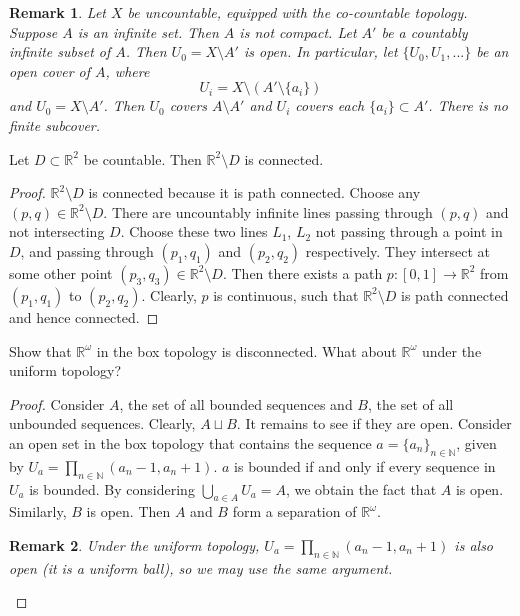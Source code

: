 \documentclass[12pt]{article}
\newtheorem{remark}{Remark}
\begin{document}
\begin{remark}
    Let $X$ be uncountable, equipped with the co-countable topology.
    Suppose $A$ is an infinite set. Then $A$ is not compact.
    Let $A'$ be a countably infinite subset of $A$. Then $U_0 = X \setminus A'$
    is open. In particular, let $\{U_0, U_1, ...\}$
    be an open cover of $A$, where $$U_i = X \setminus (A' \setminus \{a_i\})$$
    and $U_0 = X \setminus A'$.
    Then $U_0$ covers $A \setminus A'$ and $U_i$ covers each $\{a_i\} \subset A'$.
    There is no finite subcover.
\end{remark}

Let $D \subset \mathbb{R}^2$ be countable.
Then $\mathbb{R}^2 \setminus D$ is connected.
\begin{proof}
     $\mathbb{R}^2 \setminus D$ is connected because it is path connected.
     Choose any $(p, q) \in \mathbb{R}^2 \setminus D$.
     There are uncountably infinite lines passing through $(p, q)$ and not intersecting $D$.
     Choose these two lines $L_1$, $L_2$ not passing through a point in $D$,
     and passing through $(p_1, q_1)$
     and $(p_2, q_2)$ respectively.
     They intersect at some other point $(p_3, q_3) \in \mathbb{R}^2 \setminus D$.
     Then there exists a path $p: [0, 1] \rightarrow \mathbb{R}^2$
     from $(p_1, q_1)$ to $(p_2, q_2)$. Clearly, $p$ is continuous, such that
     $\mathbb{R}^2 \setminus D$ is path connected and hence connected.
\end{proof}

Show that $\mathbb{R}^\omega$ in the box topology is disconnected. What about 
$\mathbb{R}^\omega$ under the uniform topology?


\begin{proof}
    Consider $A$, the set of all bounded sequences and $B$, the set
of all unbounded sequences. Clearly, $A \sqcup B$. It remains to see if they are open.
Consider an open set in the box topology that contains the sequence 
$a = \{a_n\}_{n \in \mathbb{N}}$, given by $U_a = \prod_{n \in \mathbb{N}} (a_n - 1, a_n + 1)$.
$a$ is bounded if and only if every sequence in $U_a$ is bounded.
By considering $\bigcup_{a \in A} U_a = A$, we obtain the fact that $A$ is open.
Similarly, $B$ is open. Then $A$ and $B$ form a separation of $\mathbb{R}^\omega$.
\begin{remark}
    Under the uniform topology, $U_a = \prod_{n \in \mathbb{N}} (a_n - 1, a_n + 1)$
is also open (it is a uniform ball), so we may use the same argument.
\end{remark}
\end{proof}
\end{document}
